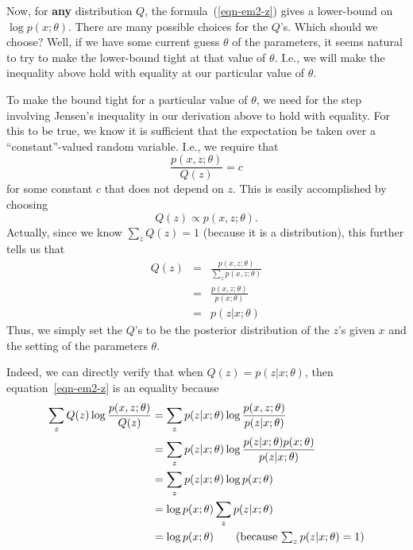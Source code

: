\documentclass{article}
\begin{document}
Now, for {\bf any} distribution $Q$, the formula~(\ref{eqn-em2-z})
gives a lower-bound on $\log p(x;\theta)$.
There are many possible choices for the $Q$'s.  Which should we choose?
Well, if we have some current guess $\theta$ of the parameters, it seems
natural to try to make the lower-bound tight at that value of $\theta$.
I.e., we will make the inequality above hold with equality at our
particular value of $\theta$. 


To make the bound tight for a particular value of $\theta$, we need
for the step involving Jensen's inequality in
our derivation above to hold with equality. For this to be true,
we know it is sufficient that the expectation
be taken over a ``constant''-valued random variable.  I.e., we require
that
\[
\frac{p(x, z; \theta)}{Q(z)} = c
\]
for some constant $c$ that does not depend on $z$. This is
easily accomplished by choosing
\[
Q(z) \propto p(x, z; \theta).
\]
Actually, since we know $\sum_z Q(z) = 1$ (because it is a distribution),
this further tells us that
\begin{eqnarray}
	Q(z) &=& \frac{p(x, z; \theta)}{\sum_z p(x, z; \theta)} \nonumber\\
	&=& \frac{p(x, z; \theta)}{p(x; \theta)} \nonumber\\
	&=& p(z | x; \theta)\label{eqn:Q}
\end{eqnarray}
Thus, we simply set the $Q$'s to be the posterior distribution of
the $z$'s given $x$ and the setting of the parameters $\theta$.


Indeed, we can directly verify that when $Q(z) = p(z | x; \theta)$, then equation~\eqref{eqn-em2-z} is an equality because 
\begin{align}
\sum_{z} Q(z) \log \frac{p(x, z; \theta)}{Q(z)} & = \sum_{z} p(z | x;\theta) \log \frac{p(x, z; \theta)}{p(z | x;\theta)} \nonumber\\
&= \sum_{z} p(z | x;\theta) \log \frac{p(z | x; \theta) p(x;\theta)}{p(z | x;\theta)} \nonumber\\
& = \sum_{z} p(z | x;\theta) \log p(x;\theta) \nonumber\\
& = \log p(x;\theta) \sum_{z} p(z | x; \theta) \nonumber \\
& = \log p(x; \theta) \tag{because $\sum_{z} p(z | x;\theta)=1$}
\end{align}
\end{document}

